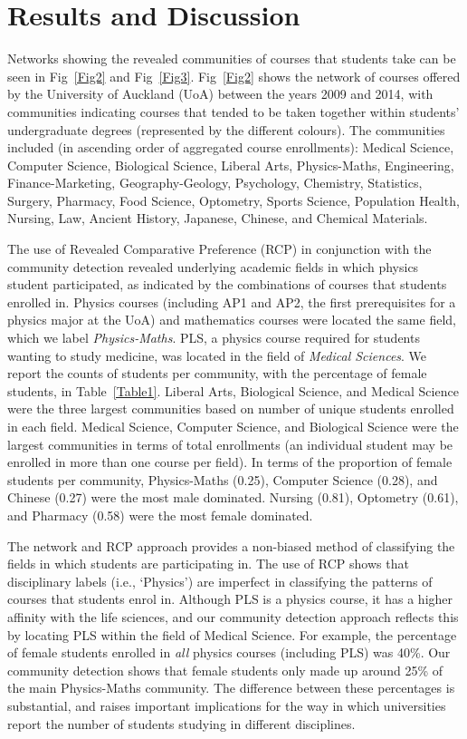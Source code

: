 \section*{Results and Discussion}
Networks showing the revealed communities of courses that students take can be seen in Fig~\ref{Fig2} and Fig~\ref{Fig3}. Fig~\ref{Fig2} shows the network of courses offered by the University of Auckland (UoA) between the years 2009 and 2014, with communities indicating courses that tended to be taken together within students' undergraduate degrees (represented by the different colours). The communities included (in ascending order of aggregated course enrollments): Medical Science, Computer Science, Biological Science, Liberal Arts, Physics-Maths, Engineering, Finance-Marketing, Geography-Geology, Psychology, Chemistry, Statistics, Surgery, Pharmacy, Food Science, Optometry, Sports Science, Population Health, Nursing, Law, Ancient History, Japanese, Chinese, and Chemical Materials.

The use of Revealed Comparative Preference (RCP) in conjunction with the community detection revealed underlying academic fields in which physics student participated, as indicated by the combinations of courses that students enrolled in. Physics courses (including AP1 and AP2, the first prerequisites for a physics major at the UoA) and mathematics courses were located the same field, which we label \textit{Physics-Maths}. PLS, a physics course required for students wanting to study medicine, was located in the field of \textit{Medical Sciences}. We report the counts of students per community, with the percentage of female students, in Table~\ref{Table1}. Liberal Arts, Biological Science, and Medical Science were the three largest communities based on number of unique students enrolled in each field. Medical Science, Computer Science, and Biological Science were the largest communities in terms of total enrollments (an individual student may be enrolled in more than one course per field). In terms of the proportion of female students per community, Physics-Maths (0.25), Computer Science (0.28), and Chinese (0.27) were the most male dominated. Nursing (0.81), Optometry (0.61), and Pharmacy (0.58) were the most female dominated. 

The network and RCP approach provides a non-biased method of classifying the fields in which students are participating in. The use of RCP shows that disciplinary labels (i.e., `Physics') are imperfect in classifying the patterns of courses that students enrol in. Although PLS is a physics course, it has a higher affinity with the life sciences, and our community detection approach reflects this by locating PLS within the field of Medical Science. For example, the percentage of female students enrolled in \textit{all} physics courses (including PLS) was 40\%. Our community detection shows that female students only made up around 25\% of the main Physics-Maths community. The difference between these percentages is substantial, and raises important implications for the way in which universities report the number of students studying in different disciplines.

